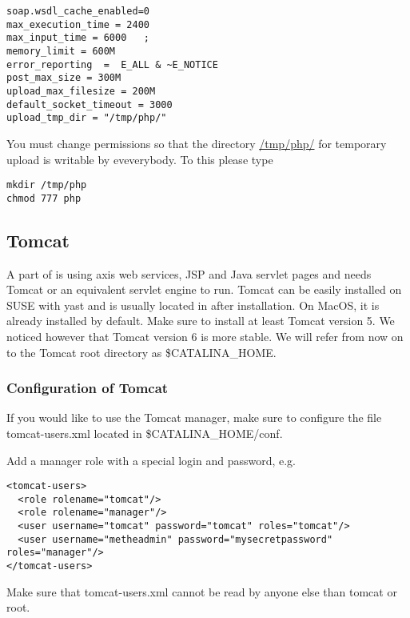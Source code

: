\documentclass{book}
\begin{document}
\begin{footnotesize} 
\begin{verbatim}
soap.wsdl_cache_enabled=0
max_execution_time = 2400    
max_input_time = 6000	;
memory_limit = 600M      
error_reporting  =  E_ALL & ~E_NOTICE
post_max_size = 300M
upload_max_filesize = 200M
default_socket_timeout = 3000
upload_tmp_dir = "/tmp/php/"
\end{verbatim} 
\end{footnotesize}

You must change permissions so that the directory \url{/tmp/php/} for temporary upload is writable by eveverybody. To this please type 

\begin{footnotesize} 
\begin{verbatim}
mkdir /tmp/php
chmod 777 php
\end{verbatim} 
\end{footnotesize}


\subsection{Tomcat}

A part of \neat is using axis web services, JSP and Java servlet pages and needs Tomcat
or an equivalent servlet engine to run.
Tomcat can be easily installed on SUSE with yast and is
usually located in  after installation.
On MacOS, it is already installed by default.
Make sure to install at least Tomcat version 5.
We noticed however that Tomcat version 6 is more stable.
We will refer from now on to the Tomcat root directory as \$CATALINA\_HOME.

\subsubsection{Configuration of Tomcat}
If you would like to use the Tomcat manager, make sure to configure the file
tomcat-users.xml located in \$CATALINA\_HOME/conf.

Add a manager role with a special login and password, e.g.
\begin{verbatim}
<tomcat-users>
  <role rolename="tomcat"/>
  <role rolename="manager"/>
  <user username="tomcat" password="tomcat" roles="tomcat"/>
  <user username="metheadmin" password="mysecretpassword" roles="manager"/>
</tomcat-users>
\end{verbatim}

Make sure that tomcat-users.xml cannot be read by anyone else than tomcat or root.\\
\end{document}

